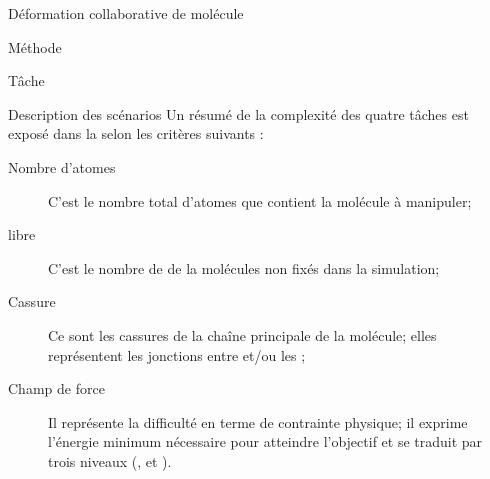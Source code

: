 \documentclass[myfrancais]{mythesis}
\begin{document}
\begin{mychapter}{Déformation collaborative de molécule}
\begin{mysection}{Méthode}
\begin{mysubsection}{Tâche}
\begin{mysubsubsection}{Description des scénarios}
					Un résumé de la complexité des quatre tâches est exposé dans la  selon les critères suivants :
					\begin{description}
						\item[Nombre d'atomes] C'est le nombre total d'atomes que contient la molécule à manipuler;
						\item[ libre] C'est le nombre de  de la molécules non fixés dans la simulation;
						\item[Cassure] Ce sont les cassures de la chaîne principale de la molécule; elles représentent les jonctions entre \myhelice* et/ou les \myfeuillet*;
						\item[Champ de force] Il représente la difficulté en terme de contrainte physique; il exprime l'énergie minimum nécessaire pour atteindre l'objectif et se traduit par trois niveaux (,  et ).
					\end{description}


\end{mysubsubsection}
\end{mysubsection}
\end{mysection}
\end{mychapter}
\end{document}
